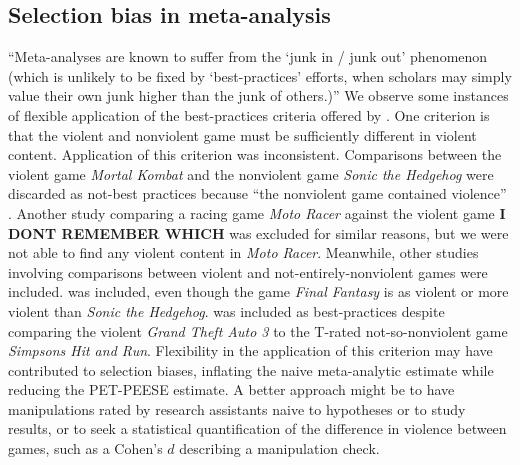 \documentclass[man]{apa6}
\begin{document}
\subsection{Selection bias in meta-analysis} 
``Meta-analyses are known to suffer from the `junk in / junk out' phenomenon (which is unlikely to be fixed by `best-practices' efforts, when scholars may simply value their own junk higher than the junk of others.)'' \citep{Ferguson:Heene:2012}
We observe some instances of flexible application of the best-practices criteria offered by \citet{Anderson:etal:2010}. One criterion is that the violent and nonviolent game must be sufficiently different in violent content. Application of this criterion was inconsistent. Comparisons between the violent game {\em Mortal Kombat} and the nonviolent game {\em Sonic the Hedgehog} were discarded as not-best practices \citep[e.g.,][]{CITATION:NEEDED:2000} because ``the nonviolent game contained violence'' \citep[supplementary materials]{Anderson:etal:2010}. Another study comparing a racing game {\em Moto Racer} against the violent game \textbf{I DONT REMEMBER WHICH} \citep{Brooks:1996} was excluded for similar reasons, but we were not able to find any violent content in {\em Moto Racer}. Meanwhile, other studies involving comparisons between violent and not-entirely-nonviolent games were included. \citet{Konijn:etal:2007} was included, even though the game {\em Final Fantasy} is as violent or more violent than {\em Sonic the Hedgehog}. \citet{Brady:Mathews:2006} was included as best-practices despite comparing the violent {\em Grand Theft Auto 3} to the T-rated not-so-nonviolent game {\em Simpsons Hit and Run}. 
Flexibility in the application of this criterion may have contributed to selection biases, inflating the naive meta-analytic estimate while reducing the PET-PEESE estimate. A better approach might be to have manipulations rated by research assistants naive to hypotheses or to study results, or to seek a statistical quantification of the difference in violence between games, such as a Cohen's $d$ describing a manipulation check.
\end{document}
